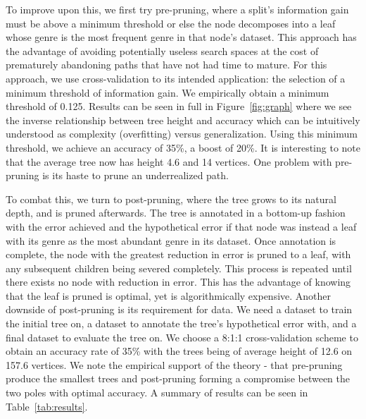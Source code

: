 \documentclass[11pt, twocolumn]{article}
\begin{document}
    To improve upon this, we first try pre-pruning, where a split’s
information gain must be above a minimum threshold or else the node decomposes
into a leaf whose genre is the most frequent genre in that node’s dataset.
This approach has the advantage of avoiding potentially useless search spaces
at the cost of prematurely abandoning paths that have not had time to mature.
For this approach, we use cross-validation to its intended application: the
selection of a minimum threshold of information gain. We empirically obtain a
minimum threshold of 0.125. Results can be seen in full in Figure~\ref{fig:graph}
where we see the inverse relationship between tree height and accuracy which can
be intuitively understood as complexity (overfitting) versus generalization.
Using this minimum threshold, we achieve an accuracy of 35\%, a boost of 20\%.
It is interesting to note that the average tree now has height 4.6 and 14
vertices. One problem with pre-pruning is its haste to prune an underrealized
path.

    To combat this, we turn to post-pruning, where the tree grows to its
natural depth, and is pruned afterwards. The tree is annotated in a bottom-up
fashion with the error achieved and the hypothetical error if that node was
instead a leaf with its genre as the most abundant genre in its dataset. Once
annotation is complete, the node with the greatest reduction in error is pruned
to a leaf, with any subsequent children being severed completely. This process
is repeated until there exists no node with reduction in error. This has the
advantage of knowing that the leaf is pruned is optimal, yet is algorithmically
expensive. Another downside of post-pruning is its requirement for data. We
need a dataset to train the initial tree on, a dataset to annotate the tree’s
hypothetical error with, and a final dataset to evaluate the tree on. We choose
a 8:1:1 cross-validation scheme to obtain an accuracy rate of 35\% with the
trees being of average height of 12.6 on 157.6 vertices. We note the empirical
support of the theory - that pre-pruning produce the smallest trees and
post-pruning forming a compromise between the two poles with optimal accuracy.
A summary of results can be seen in Table~\ref{tab:results}.
\end{document}
